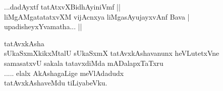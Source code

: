 \begin{entry}
\begin{shl}
...dadAyxtf tatAtxvXBidhAyiniVmf ||\\
liMgAMgatatatxvXM vijAcnxya liMgasAyujayxvAnf Bava |\\
upadisheyxYvamatha... ||
\end{shl}
\end{entry}

\begin{entry}
\begin{shl}
tatAvxkAsha\\
sUkaSxmXkikxMtalU sUkaSxmX tatAvxkAshavanunx heVLutetxVne\\
samasatxvU sakala tatavxdiMda mADalapxTaTxru\\
..... elalx AkAshagaLige meVlAdadudx\\
tatAvxkAshaveMdu tiLiyabeVku.
\end{shl}
\end{entry}

